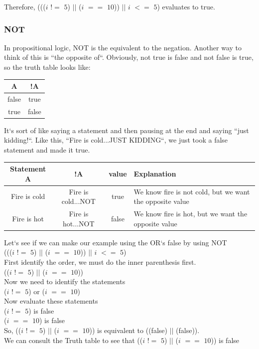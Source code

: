 \documentclass[11]{article}
\begin{document}
 Therefore, ((($i$ $!=$ $5$) $||$ ($i$ $==$ $10$)) $||$ $i$ $<=$ $5$) evaluates to true.
 
 \subsubsection{NOT}
 In propositional logic, NOT is the equivalent to the negation. Another way to think of this is ``the opposite of``. Obviously, not true is false and not false is true, so the truth table looks like:\\
 
  \begin{center}
  \begin{tabular}{ | c | c |}
    \hline
    A & !A  \\ \hline
    false & true\\ \hline
    true & false\\ 
    \hline
  \end{tabular}
\end{center}

It`s sort of like saying a statement and then pausing at the end and saying ``just kidding!``. Like this, ``Fire is cold...JUST KIDDING``, we just took a false statement and made it true.

\begin{center}
  \begin{tabular}{ | c | c | c | p{4.5cm} |}
    \hline
		Statement A  & !A & value & Explanation \\ \hline
		Fire is cold & Fire is cold...NOT & true & We know fire is not cold, but we want the opposite value\\  \hline
		
		Fire is hot & Fire is hot...NOT & false & We know fire is hot, but we want the opposite value\\ \hline		
  \end{tabular}
\end{center}

Let`s see if we can make our example using the OR`s false by using NOT\\
((($i$ $!=$ $5$) $||$ ($i$ $==$ $10$)) $||$ $i$ $<=$ $5$)\\

First identify the order, we must do the inner parenthesis first.\\
(($i$ $!=$ $5$) $||$ ($i$ $==$ $10$))\\
Now we need to identify the statements\\
($i$ $!=$ $5$) or ($i$ $==$ $10$) \\
Now evaluate these statements \\
($i$ $!=$ $5$) is false\\
 ($i$ $==$ $10$) is false \\
 So, (($i$ $!=$ $5$) $||$ ($i$ $==$ $10$)) is equivalent to ((false) $||$ (false)).\\
 We can consult the Truth table to see that (($i$ $!=$ $5$) $||$ ($i$ $==$ $10$)) is false\\
 
\end{document}

